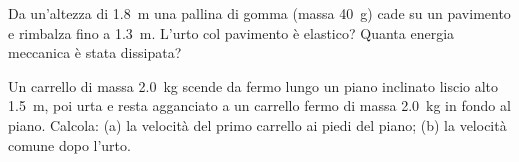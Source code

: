 \begin{esercizio}
Da un'altezza di \SI{1,8}{\metre} una pallina di gomma (massa \SI{40}{\gram}) cade su un pavimento e rimbalza fino a \SI{1,3}{\metre}. L'urto col pavimento è elastico? Quanta energia meccanica è stata dissipata?\\
\end{esercizio}

\begin{esercizio}
Un carrello di massa \SI{2,0}{\kilo\gram} scende da fermo lungo un piano inclinato liscio alto \SI{1,5}{\metre}, poi urta e resta agganciato a un carrello fermo di massa \SI{2,0}{\kilo\gram} in fondo al piano. Calcola: (a) la velocità del primo carrello ai piedi del piano; (b) la velocità comune dopo l'urto.\\
\end{esercizio}
